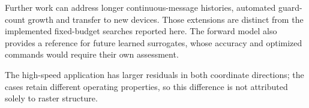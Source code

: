 Further work can address longer continuous-message histories, automated guard-count growth and transfer to new devices. Those extensions are distinct from the implemented fixed-budget searches reported here. The forward model also provides a reference for future learned surrogates, whose accuracy and optimized commands would require their own assessment.

The high-speed application has larger residuals in both coordinate directions; the cases retain different operating properties, so this difference is not attributed solely to raster structure.
